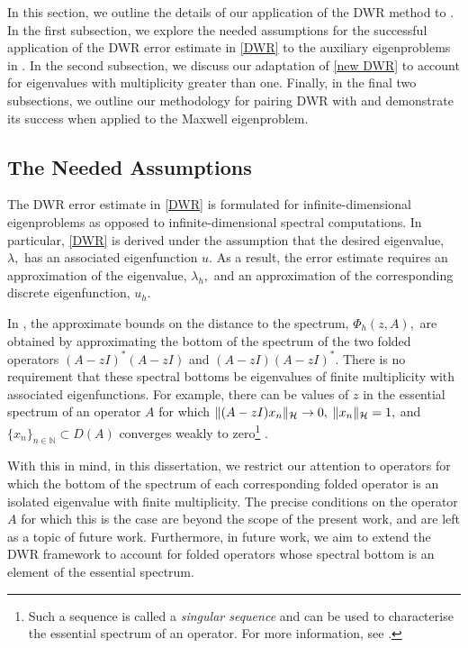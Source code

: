 In this section, we outline the details of our application of the DWR method to . In the first subsection, we explore the needed assumptions for the successful application of the DWR error estimate in \eqref{DWR} to the auxiliary eigenproblems in . In the second subsection, we discuss our adaptation of \eqref{new DWR} to account for eigenvalues with multiplicity greater than one. Finally, in the final two subsections, we outline our methodology for pairing DWR with  and demonstrate its success when applied to the Maxwell eigenproblem. 


\subsection{The Needed Assumptions}\label{ASSUMPSect}

The DWR error estimate in \eqref{DWR} is formulated for infinite-dimensional eigenproblems as opposed to infinite-dimensional spectral computations. In particular, \eqref{DWR} is derived under the assumption that the desired eigenvalue, $\lambda,$ has an associated eigenfunction $u.$ As a result, the error estimate requires an approximation of the eigenvalue, $\lambda_h,$ and an approximation of the corresponding discrete eigenfunction, $u_h$. 

In , the approximate bounds on the distance to the spectrum, $\Phi_h(z, A),$ are obtained by approximating the bottom of the spectrum of the two folded operators $(A-zI)^*(A-zI)$ and $(A-zI)(A-zI)^*.$ There is no requirement that these spectral bottoms be eigenvalues of finite multiplicity with associated eigenfunctions. For example, there can be values of $z$ in the essential spectrum of an operator $A$ for which $\|(A-zI)x_n\|_{\mathcal{H}} \rightarrow 0,$ $\|x_n\|_{\mathcal{H}} = 1,$ and $\{x_n\}_{n\in \mathbb{N}} \subset D(A)$ converges weakly to zero\footnote{Such a sequence is called a \textit{singular sequence} and can be used to characterise the essential spectrum of an operator. For more information, see \cite[Chapter~8]{Matt}.} \cite[Section 8.1.3]{Matt}. 

With this in mind, in this dissertation, we restrict our attention to operators for which the bottom of the spectrum of each corresponding folded operator is an isolated eigenvalue with finite multiplicity. The precise conditions on the operator $A$ for which this is the case are beyond the scope of the present work, and are left as a topic of future work. Furthermore, in future work, we aim to extend the DWR framework to account for folded operators whose spectral bottom is an element of the essential spectrum.


